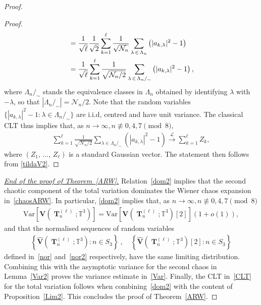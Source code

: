 \documentclass[AHL,Unicode,longabstracts,published]{cedram}
\DeclareMathOperator{\bT}{\mathbf{T}}
\newcommand{\bfv}{\mathbf{V}}
\newcommand{\T}{\mathbb{T}^3}
\newcommand{\V}[1]{\mathrm{Var}{\left[#1\right]}}
\newcommand{\Law}{\xrightarrow[]{\mathcal{L}} }
\newcommand{\notcon}[3]{ {#1} \not\equiv {#2} \pmod {#3} }
\newcommand{\Nn}{\mathcal{N}_n}
\begin{document}
\begin{proof}
\begin{proof}
\begin{equation}
\begin{split}
&=
\frac{1}{\sqrt{\ell}}
\frac{1}{\sqrt{2}}\sum_{k=1}^{\ell} \frac{1}{\sqrt{\Nn}}\sum_{\lambda \,\in\,\Lambda_n}\left(|a_{k,\lambda}|^2-1\right) \notag \\
&= \frac{1}{\sqrt{\ell}} \sum_{k=1}^{\ell}
\frac{1}{\sqrt{\Nn/2}}\sum_{\lambda\,\in\,\Lambda_n/_{\sim}}\left(|a_{k,\lambda}|^2-1\right),
\end{split}
\end{equation}
where $\Lambda_n/_{\sim}$ stands the equivalence classes in $\Lambda_n$ obtained by identifying $\lambda$ with $-\lambda$, so that $|\Lambda_n/_{\sim}|=\Nn/2$. Note that the random variables $\{ |a_{k,\lambda}|^2-1: \lambda\in \Lambda_n/_{\sim}\}$ are i.i.d, centred and have unit variance. The classical CLT thus implies that, as $n \to \infty, \notcon{n}{0,4,7}{8}$,
\begin{gather*}
\sum_{k=1}^{\ell}
\frac{1}{\sqrt{\Nn/2}}\sum_{\lambda\in \Lambda_n/_{\sim}}(|a_{k,\lambda}|^2-1) \Law \sum_{k=1}^{\ell}Z_k,
\end{gather*}
where $(Z_1,\,\ldots,\,Z_{\ell})$ is a standard Gaussian vector. The statement then follows from \eqref{tildaV2}.
\end{proof}


\noindent\underline{\emph{End of the proof of Theorem~\ref{ARW}.}} Relation~\eqref{dom2} implies that the second chaotic component of the total variation dominates the Wiener chaos expansion in~\eqref{chaosARW}. In particular, \eqref{dom2} implies that, as $n \to \infty, \notcon{n}{0,4,7}{8}$
\begin{gather*}
\V{\bfv\left(\bT_n^{(\ell)};\T\right)} =
\V{\bfv\left(\bT_n^{(\ell)};\T\right)[2]}(1+o(1)),
\end{gather*}
and that the normalised sequences of random variables
\begin{gather*}
\left\{\widehat{\bfv}\left(\bT_n^{(\ell)};\T\right) : n \in S_3\right\} \ , \quad
\left\{\widehat{\bfv}\left(\bT_n^{(\ell)};\T\right)[2] : n \in S_3\right\}
\end{gather*}
defined in~\eqref{nor} and~\eqref{nor2} respectively, have the same limiting distribution. Combining this with the asymptotic variance for the second chaos in Lemma~\ref{Var2} proves the variance estimate in~\eqref{Var}. Finally, the CLT in~\eqref{CLT} for the total variation follows when combining~\eqref{dom2} with the content of Proposition~\ref{Lim2}. This concludes the proof of Theorem~\ref{ARW}.
\end{proof}


\appendix
\end{document}
